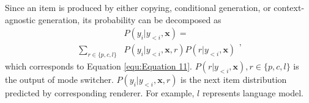 \documentclass[letterpaper]{article} %
\begin{document}
	Since an item is produced by either copying, conditional generation, or context-agnostic generation, its probability can be decomposed as
	\begin{equation} 
	\label{equ:Equation 17}
	\begin{aligned}
	& P(y_i | y_{<i}, \mathbf{x})  = \\ 
	\sum_{r \in \{p, c, l\}} & P(y_i | y_{<i}, \mathbf{x}, r) P(r | y_{<i}, \mathbf{x})
	\end{aligned},
	\end{equation} 
	which corresponds to Equation \ref{equ:Equation 11}. $P(r | y_{<i}, \mathbf{x}), r \in \{p, c, l\}$ is the output of mode switcher. $P(y_i | y_{<i}, \mathbf{x}, r)$ is the next item distribution predicted by corresponding renderer. For example, $l$ represents language model.
	
\end{document}
